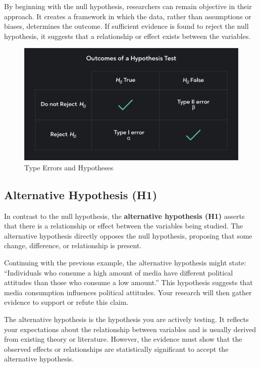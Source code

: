 \documentclass[
]{book}
\begin{document}
By beginning with the null hypothesis, researchers can remain objective in their approach. It creates a framework in which the data, rather than assumptions or biases, determines the outcome. If sufficient evidence is found to reject the null hypothesis, it suggests that a relationship or effect exists between the variables.

\begin{figure}
\centering
\includegraphics[width=1\linewidth,height=\textheight,keepaspectratio]{images/h0-ha.png}
\caption{Type Errors and Hypotheses}
\end{figure}

\subsection*{Alternative Hypothesis (H1)}\label{alternative-hypothesis-h1}

In contrast to the null hypothesis, the \textbf{alternative hypothesis (H1)} asserts that there is a relationship or effect between the variables being studied. The alternative hypothesis directly opposes the null hypothesis, proposing that some change, difference, or relationship is present.

Continuing with the previous example, the alternative hypothesis might state: ``Individuals who consume a high amount of media have different political attitudes than those who consume a low amount.'' This hypothesis suggests that media consumption influences political attitudes. Your research will then gather evidence to support or refute this claim.

The alternative hypothesis is the hypothesis you are actively testing. It reflects your expectations about the relationship between variables and is usually derived from existing theory or literature. However, the evidence must show that the observed effects or relationships are statistically significant to accept the alternative hypothesis.
\end{document}
